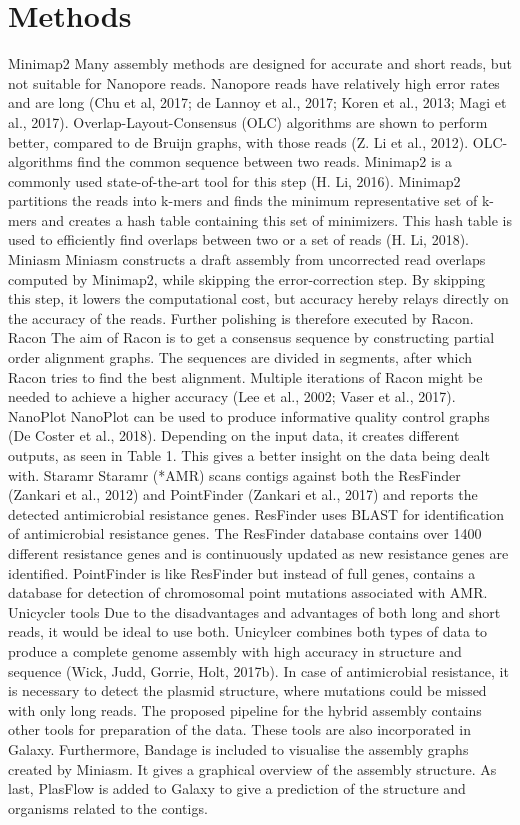 \documentclass[a4paper,num-refs]{oup-contemporary}
\begin{document}
\section{Methods}
Minimap2
Many assembly methods are designed for accurate and short reads, but not suitable for Nanopore reads. Nanopore reads have relatively high error rates and are long (Chu et al, 2017; de Lannoy et al., 2017; Koren et al., 2013; Magi et al., 2017). Overlap-Layout-Consensus (OLC) algorithms are shown to perform better, compared to de Bruijn graphs, with those reads (Z. Li et al., 2012). OLC-algorithms find the common sequence between two reads. Minimap2 is a commonly used state-of-the-art tool for this step (H. Li, 2016). Minimap2 partitions the reads into k-mers and finds the minimum representative set of k-mers and creates a hash table containing this set of minimizers. This hash table is used to efficiently find overlaps between two or a set of reads (H. Li, 2018).
Miniasm
Miniasm constructs a draft assembly from uncorrected read overlaps computed by Minimap2, while skipping the error-correction step. By skipping this step, it lowers the computational cost, but accuracy hereby relays directly on the accuracy of the reads. Further polishing is therefore executed by Racon.
Racon
The aim of Racon is to get a consensus sequence by constructing partial order alignment graphs. The sequences are divided in segments, after which Racon tries to find the best alignment. Multiple iterations of Racon might be needed to achieve a higher accuracy (Lee et al., 2002; Vaser et al., 2017). 
NanoPlot
NanoPlot can be used to produce informative quality control graphs (De Coster et al., 2018). Depending on the input data, it creates different outputs, as seen in Table 1. This gives a better insight on the data being dealt with.
Staramr
Staramr (*AMR) scans contigs against both the ResFinder (Zankari et al., 2012) and PointFinder (Zankari et al., 2017) and reports the detected antimicrobial resistance genes. ResFinder uses BLAST for identification of antimicrobial resistance genes. The ResFinder database contains over 1400 different resistance genes and is continuously updated as new resistance genes are identified. PointFinder is like ResFinder but instead of full genes, contains a database for detection of chromosomal point mutations associated with AMR.
Unicycler tools
Due to the disadvantages and advantages of both long and short reads, it would be ideal to use both. Unicylcer combines both types of data to produce a complete genome assembly with high accuracy in structure and sequence (Wick, Judd, Gorrie,  Holt, 2017b). In case of antimicrobial resistance, it is necessary to detect the plasmid structure, where mutations could be missed with only long reads. The proposed pipeline for the hybrid assembly contains other tools for preparation of the data. These tools are also incorporated in Galaxy. Furthermore, Bandage is included to visualise the assembly graphs created by Miniasm. It gives a graphical overview of the assembly structure. As last, PlasFlow is added to Galaxy to give a prediction of the structure and organisms related to the contigs.
\end{document}

